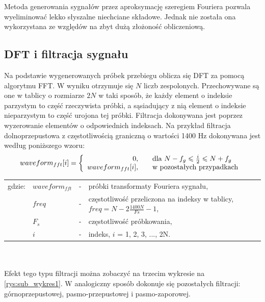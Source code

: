 Metoda generowania sygnałów przez aproksymację szeregiem Fouriera pozwala wyeliminować lekko słyszalne niechciane składowe. Jednak nie została ona wykorzystana ze względów na zbyt dużą złożoność obliczeniową. 

\subsection{DFT i filtracja sygnału}
Na podstawie wygenerowanych próbek przebiegu oblicza się DFT za pomocą algorytmu FFT. W wyniku otrzymuje się $N$ liczb zespolonych. Przechowywane są one w tablicy o rozmiarze $2N$ w taki sposób, że każdy element o indeksie parzystym to część rzeczywista próbki, a sąsiadujący z nią element o indeksie nieparzystym to część urojona tej próbki. Filtracja dokonywana jest poprzez wyzerowanie elementów o odpowiednich indeksach. Na przykład filtracja dolnoprzepustowa z częstotliwością graniczną o wartości 1400 Hz dokonywana jest według poniższego wzoru:
\begin{equation} \label{equ:sub_3}
waveform_{fft}[i]=\left \{\begin{array}{ r l }
0, & \quad  \text{dla } N - f_g \leqslant \frac{i}{2} \leqslant N + f_g \\
waveform_{fft}[i], & \quad \text{w pozostałych przypadkach } 

\end{array}
\right.
\end{equation}
\begin{tabular}{ l l l l}
	gdzie: & $waveform_{fft}$ &  - & próbki transformaty Fouriera sygnału, \\
	&	$freq$ & - &  częstotliwość przeliczona na indeksy w tablicy, $freq = N - 2 \frac{1400N}{Fs} - 1$, \\
	&	$F_s$ & - & częstotliwość próbkowania,\\
	&	$i$ & - &  indeks, $i$ = 1, 2, 3, ..., 2N.\\
\end{tabular} \\ \\

Efekt tego typu filtracji można zobaczyć na trzecim wykresie na \ref{rys:sub_wykres1}. W analogiczny sposób dokonuje się pozostałych filtracji: górnoprzepustowej, pasmo-przepustowej i pasmo-zaporowej.

